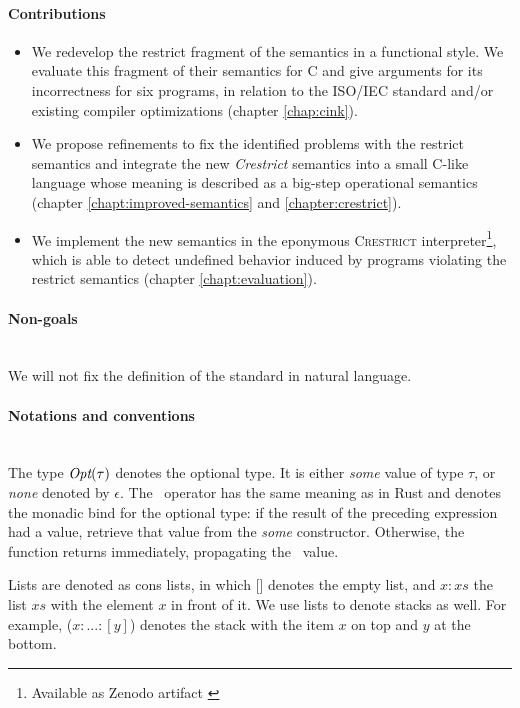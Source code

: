 \paragraph{Contributions}
\begin{itemize}
    \item We redevelop the restrict fragment of the \cink{} semantics in a functional style.
    We evaluate this fragment of their semantics for C and give arguments for its incorrectness for six
    programs, in relation to the ISO/IEC standard and/or existing compiler optimizations (chapter \ref{chap:cink}).
    \item We propose refinements to fix the identified problems with the restrict semantics and
    integrate the new \textit{Crestrict} semantics into a small C-like language whose meaning is described as a big-step operational semantics (chapter \ref{chapt:improved-semantics} and \ref{chapter:crestrict}).
    \item We implement the new semantics in the eponymous \textsc{Crestrict} interpreter\footnote{Available as Zenodo artifact \cite{klappe_2024_11031862}}, which is able to detect
    undefined behavior induced by programs violating the restrict semantics (chapter \ref{chapt:evaluation}).
\end{itemize}

\paragraph{Non-goals} \leavevmode \\
We will not fix the definition of the standard in natural language.

\paragraph{Notations and conventions} \leavevmode\\ 
The type $\textit{Opt}(\tau)$ denotes the optional type.
It is either \textit{some} value of type $\tau$, or \textit{none} denoted by $\epsilon$.
The \errbind \ operator has the same meaning as in Rust and denotes the monadic bind for the optional type:
if the result of the preceding expression had a value, retrieve that value from the \textit{some} constructor.
Otherwise, the function returns immediately, propagating the \nonesym \ value.

Lists are denoted as cons lists, in which 
[] denotes the empty list, and $x : xs$ the list $xs$ with the element $x$
in front of it.
We use lists to denote stacks as well.
For example, ($x : . .. : [y]$) denotes the stack with the item $x$ on top and $y$ at the bottom.

